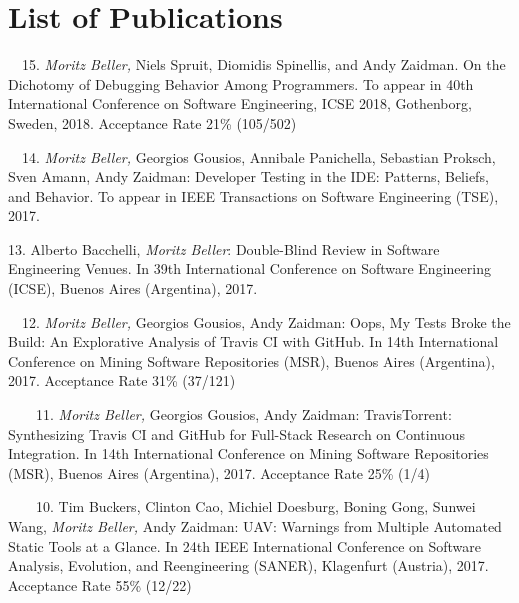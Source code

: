 \chapter*{List of Publications}
\label{publications}

\begin{etaremune}{\small
\item[\faFileTextO~~15.] \emph{Moritz Beller,} Niels Spruit, Diomidis Spinellis, and Andy
  Zaidman. On the Dichotomy of Debugging Behavior Among Programmers. To appear in 40th
  International Conference on Software Engineering, ICSE 2018, Gothenborg, Sweden, 2018. Acceptance
  Rate 21\% (105/502)

\item[\faFileTextO~~14.] \emph{Moritz Beller,} Georgios Gousios, Annibale Panichella, Sebastian
  Proksch, Sven Amann, Andy Zaidman: Developer Testing in the IDE: Patterns, Beliefs, and
  Behavior. To appear in IEEE Transactions on Software Engineering (TSE), 2017.

\item[13.] Alberto Bacchelli, \emph{Moritz Beller}: Double-Blind Review in Software Engineering
  Venues. In 39th International Conference on Software Engineering (ICSE), Buenos Aires
  (Argentina), 2017.

\item[\faFileTextO~~12.] \emph{Moritz Beller,} Georgios Gousios, Andy Zaidman: Oops, My Tests
  Broke the Build: An Explorative Analysis of Travis CI with GitHub. In 14th International
  Conference on Mining Software Repositories (MSR), Buenos Aires (Argentina), 2017.  Acceptance
  Rate 31\% (37/121)

\item[\faTrophy~~\faFileTextO~~11.] \emph{Moritz Beller,} Georgios Gousios, Andy Zaidman:
  TravisTorrent: Synthesizing Travis CI and GitHub for Full-Stack Research on Continuous
  Integration. In 14th International Conference on Mining Software Repositories (MSR), Buenos Aires
  (Argentina), 2017.  Acceptance Rate 25\% (1/4)

\item[\faTrophy~~\faFileTextO~~10.] Tim Buckers, Clinton Cao, Michiel Doesburg, Boning Gong, Sunwei
  Wang, \emph{Moritz Beller,} Andy Zaidman: UAV: Warnings from Multiple Automated Static Tools at
  a Glance. In 24th IEEE International Conference on Software Analysis, Evolution, and
  Reengineering (SANER), Klagenfurt (Austria), 2017.  Acceptance Rate 55\% (12/22)

}
\end{etaremune}
